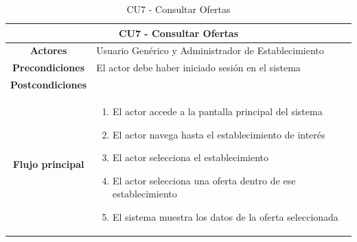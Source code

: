 \begin{table}[h]
    \centering
    \begin{tabular}{|c|p{10cm}|}
        \hline
        \multicolumn{2}{|c|}{\textbf{CU7 - Consultar Ofertas}}                                       \\
        \hline
        \textbf{Actores}         & Usuario Genérico y Administrador de Establecimiento               \\
        \hline
        \textbf{Precondiciones}  & El actor debe haber iniciado sesión en el sistema                 \\
        \hline
        \textbf{Postcondiciones} &                                                                   \\
        \hline
        \textbf{Flujo principal} & \begin{enumerate}
                                       \item El actor accede a la pantalla principal del sistema
                                       \item El actor navega hasta el establecimiento de interés
                                       \item El actor selecciona el establecimiento
                                       \item El actor selecciona una oferta dentro de ese establecimiento
                                       \item El sistema muestra los datos de la oferta seleccionada
                                   \end{enumerate} \\
        \hline
    \end{tabular}
    \caption{CU7 - Consultar Ofertas }
\end{table}

